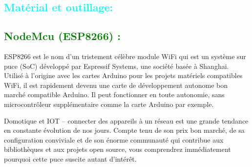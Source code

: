 \begin{flushleft}
	\section{\textcolor{cyan}{Matérial et outillage: }}
		\subsection{\textcolor{green}{NodeMcu (ESP8266) :}}
		ESP8266 est le nom d’un tristement célèbre module WiFi qui est un système sur puce (SoC) développé par Espressif Systems, une société basée à Shanghai. Utilisé à l’origine avec les cartes Arduino pour les projets matériels compatibles WiFi, il est rapidement devenu une carte de développement autonome bon marché compatible Arduino. Il peut fonctionner en toute autonomie, sans microcontrôleur supplémentaire comme la carte Arduino par exemple.\newline
		
		Domotique et IOT – connecter des appareils à un réseau est une grande tendance en constante évolution de nos jours. Compte tenu de son prix bon marché, de sa configuration conviviale et de son énorme communauté qui contribue aux bibliothèques et aux projets open source, vous comprendrez immédiatement pourquoi cette puce suscite autant d’intérêt.\newline
		

\end{flushleft}
